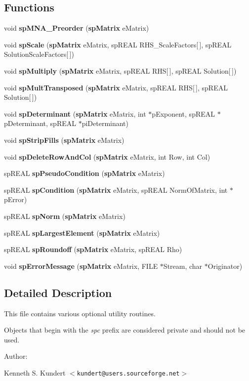 \subsection*{Functions}
\begin{CompactItemize}
\item 
void {\bf sp\-MNA\_\-Preorder} ({\bf sp\-Matrix} e\-Matrix)
\item 
void {\bf sp\-Scale} ({\bf sp\-Matrix} e\-Matrix, sp\-REAL RHS\_\-Scale\-Factors[$\,$], sp\-REAL Solution\-Scale\-Factors[$\,$])
\item 
void {\bf sp\-Multiply} ({\bf sp\-Matrix} e\-Matrix, sp\-REAL RHS[$\,$], sp\-REAL Solution[$\,$])
\item 
void {\bf sp\-Mult\-Transposed} ({\bf sp\-Matrix} e\-Matrix, sp\-REAL RHS[$\,$], sp\-REAL Solution[$\,$])
\item 
void {\bf sp\-Determinant} ({\bf sp\-Matrix} e\-Matrix, int $\ast$p\-Exponent, sp\-REAL $\ast$p\-Determinant, sp\-REAL $\ast$pi\-Determinant)
\item 
void {\bf sp\-Strip\-Fills} ({\bf sp\-Matrix} e\-Matrix)
\item 
void {\bf sp\-Delete\-Row\-And\-Col} ({\bf sp\-Matrix} e\-Matrix, int Row, int Col)
\item 
sp\-REAL {\bf sp\-Pseudo\-Condition} ({\bf sp\-Matrix} e\-Matrix)
\item 
sp\-REAL {\bf sp\-Condition} ({\bf sp\-Matrix} e\-Matrix, sp\-REAL Norm\-Of\-Matrix, int $\ast$p\-Error)
\item 
sp\-REAL {\bf sp\-Norm} ({\bf sp\-Matrix} e\-Matrix)
\item 
sp\-REAL {\bf sp\-Largest\-Element} ({\bf sp\-Matrix} e\-Matrix)
\item 
sp\-REAL {\bf sp\-Roundoff} ({\bf sp\-Matrix} e\-Matrix, sp\-REAL Rho)
\item 
void {\bf sp\-Error\-Message} ({\bf sp\-Matrix} e\-Matrix, FILE $\ast$Stream, char $\ast$Originator)
\end{CompactItemize}


\subsection{Detailed Description}
 This file contains various optional utility routines.

Objects that begin with the {\em spc} prefix are considered private and should not be used.

\begin{Desc}
\item[Author: ]\par
 Kenneth S. Kundert $<${\tt kundert@users.sourceforge.net}$>$\end{Desc}


